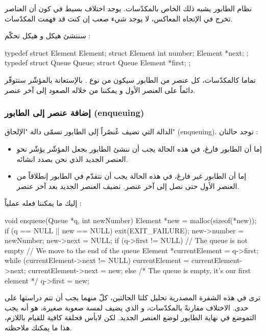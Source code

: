 نظام الطابور يشبه ذلك الخاص بالمكدّسات. يوجد اختلاف بسيط في كون أن العناصر تخرج في الإتجاه المعاكس، لا يوجد شيء صعب إن كنت قد فهمت المكدّسات.

سننشئ هيكل
و هيكل تحكّم
 :

\begin{Csource}
typedef struct Element Element;
struct Element
{
	int number;
	Element *next;
};
typedef struct Queue Queue;
struct Queue
{
	Element *first;
};
\end{Csource}

تماما كالمكدّسات، كل عنصر من الطابور سيكون من نوع
.
بالإستعانة بالمؤشّر 
سنتوفّر دائماً على العنصر الأول و يمكننا من خلاله الصعود إلى آخر عنصر.

\subsubsection{إضافة عنصر إلى الطابور (\textenglish{enqueuing})}

الدالة التي تضيف عُنصُراً إلى الطابور تسمّى دالة "الإلحاق"
(\textenglish{enqueuing}).
توجد حالتان :

\begin{itemize}
	\item إما أن الطابور فارغ، في هذه الحالة يجب أن ننشئ الطابور بجعل المؤشّر
	يؤشّر نحو العنصر الجديد الذي نحن بصدد انشائه.
	\item إما أن الطابور غير فارغ، في هذه الحالة يجب أن نتقدّم في الطابور إنطلاقاً من العنصر الأول حتى نصل إلى آخر عنصر. نضيف العنصر الجديد بعد آخر عنصر.
\end{itemize}
إليك ما يمكننا فعله عملياً :

\begin{Csource}
void enqueue(Queue *q, int newNumber)
{
	Element *new = malloc(sizeof(*new));
	if (q == NULL || new == NULL)
	{
		exit(EXIT_FAILURE);
	}
	new->number = newNumber;
	new->next = NULL;
	if (q->first != NULL) // The queue is not empty
	{
		// We move to the end of the queue
		Element *currentElement = q->first;
		while (currentElement->next != NULL)
		{
			currentElement = currentElement->next;
		}
		currentElement->next = new;
	}
	else /* The queue is empty, it's our first element */
	{
		q->first = new;
	}
}
\end{Csource}

ترى في هذه الشفرة المصدرية تحليل كلتا الحالتين، كلّ منهما يجب أن تتم دراستها على حدى. الاختلاف مقارنةً بالمكدّسات، و الذي يضيف لمسة صعوبة صغيرة، هو أنه يجب التموضع في نهاية الطابور لوضع العنصر الجديد. لكن لابأس فحلقة
كافية للقيام باللازم، هذا ما يمكنك ملاحظته.

